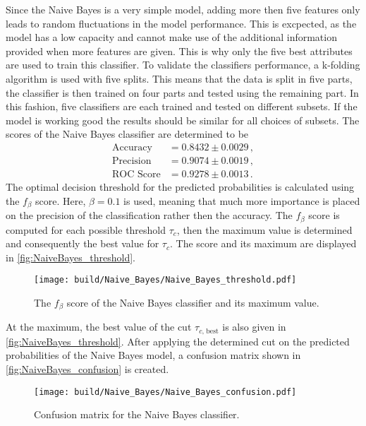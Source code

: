 Since the Naive Bayes is a very simple model, adding more then five features only leads to random
fluctuations in the model performance. This is excpected, as the model has a low capacity and
cannot make use of the additional information provided when more features are given.
This is why only the five best attributes are used to train this classifier.
To validate the classifiers performance, a k-folding algorithm is used with five splits.
This means that the data is split in five parts, the classifier is then trained on four parts and tested using
the remaining part. In this fashion, five classifiers are each trained and tested on different subsets.
If the model is working good the results should be similar for all choices of subsets.
The scores of the Naive Bayes classifier are determined to be %
\begin{align*}
  \text{Accuracy} &= 0.8432\pm0.0029 \,, \\
  \text{Precision} &= 0.9074\pm0.0019 \,, \\
  \text{ROC Score} &= 0.9278\pm0.0013 \,.
\end{align*}
The optimal decision threshold for the predicted probabilities is calculated using
the $f_\beta$ score. Here, $\beta=0.1$ is used, meaning that much more importance
is placed on the precision of the classification rather then the accuracy.
The $f_\beta$ score is computed for each possible threshold $\tau_c$, then
the maximum value is determined and consequently the best value for $\tau_c$.
The score and its maximum are displayed in \autoref{fig:NaiveBayes_threshold}.

\begin{figure}[H]
  \centering
  \texttt{[image: build/Naive\_Bayes/Naive\_Bayes\_threshold.pdf]}
  \caption{The $f_\beta$ score of the Naive Bayes classifier and its maximum value.}
  \label{fig:NaiveBayes_threshold}
\end{figure}

At the maximum, the best value of the cut $\tau_{c \text{, best}}$ is also given in \autoref{fig:NaiveBayes_threshold}.
After applying the determined cut on the predicted probabilities of the Naive Bayes model,
a confusion matrix shown in \autoref{fig:NaiveBayes_confusion} is created.

\begin{figure}[H]
  \centering
  \texttt{[image: build/Naive\_Bayes/Naive\_Bayes\_confusion.pdf]}
  \caption{Confusion matrix for the Naive Bayes classifier.}
  \label{fig:NaiveBayes_confusion}
\end{figure}

